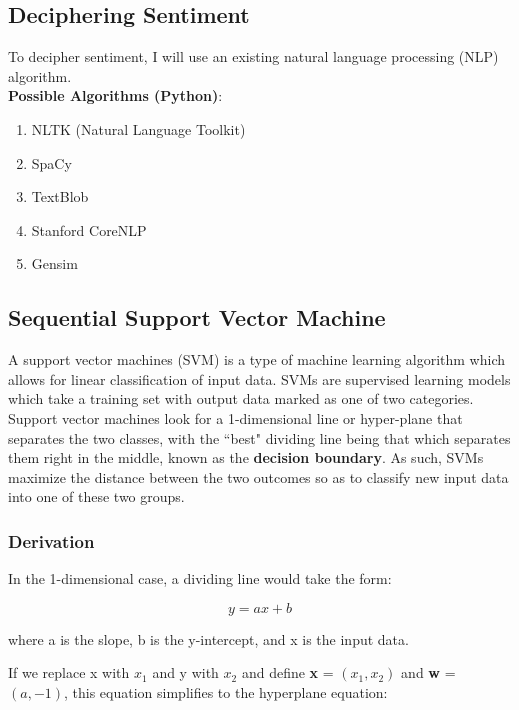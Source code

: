\documentclass{article}
\begin{document}
\subsection{Deciphering Sentiment}
\label{sec:deciphering}

To decipher sentiment, I will use an existing natural language processing (NLP) algorithm. \\

\textbf{Possible Algorithms (Python)}:

\begin{enumerate}
    \item NLTK (Natural Language Toolkit)
    \item SpaCy
    \item TextBlob
    \item Stanford CoreNLP
    \item Gensim
\end{enumerate}

\subsection{Sequential Support Vector Machine}
\label{sec:sequentialSVM}

A support vector machines (SVM) is a type of machine learning algorithm which allows for linear classification of input data. SVMs are supervised learning models which take a training set with output data marked as one of two categories. Support vector machines look for a 1-dimensional line or hyper-plane that separates the two classes, with the ``best" dividing line being that which separates them right in the middle, known as the \textbf{decision boundary}. As such, SVMs maximize the distance between the two outcomes so as to classify new input data into one of these two groups.

\subsubsection{Derivation}
\label{sec:derivation}

In the 1-dimensional case, a dividing line would take the form:

\[ y = ax + b \]

where a is the slope, b is the y-intercept, and x is the input data.

If we replace x with $x_1$ and y with $x_2$ and define \textbf{x} = $(x_1, x_2)$ and \textbf{w} = $(a, -1)$, this equation simplifies to the hyperplane equation:
\end{document}
